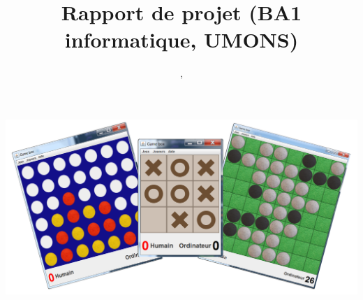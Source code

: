 \documentclass[12pt]{article}
\title{Rapport de projet (BA1 informatique, UMONS)}
\author{\mlq{}, \ghs}
\begin{document}
\maketitle
\includegraphics[width=\textwidth]{../cover.png}
\tableofcontents
\newpage











\end{document}
